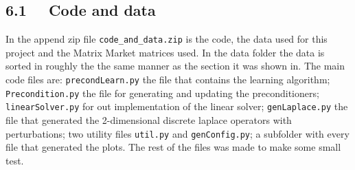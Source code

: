 \subsection*{6.1 \ \ Code and data}
In the append zip file \texttt{code\_and\_data.zip} is the code, the data used for this project and the Matrix Market matrices used. In the data folder the data is sorted in roughly the the same manner as the section it was shown in. The main code files are: \texttt{precondLearn.py} the file that contains the learning algorithm; \texttt{Precondition.py} the file for generating and updating the preconditioners; \texttt{linearSolver.py} for out implementation of the linear solver; \texttt{genLaplace.py} the file that generated the 2-dimensional discrete laplace operators with perturbations; two utility files \texttt{util.py} and \texttt{genConfig.py}; a subfolder with every file that generated the plots. The rest of the files was made to make some small test.